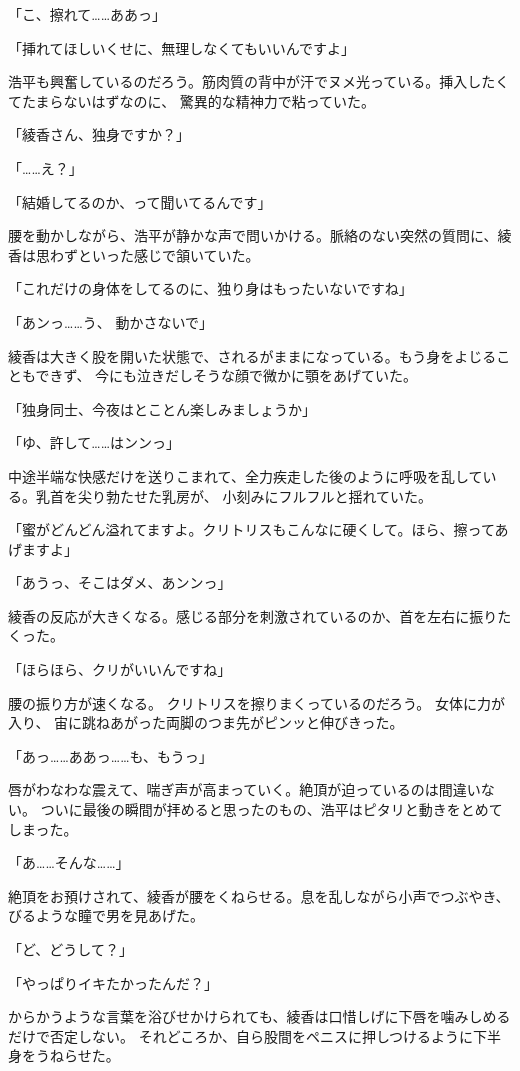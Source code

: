 ﻿\documentclass[
    book,tate,
    line_length=30zw,
    jafontsize=12pt,
    paper=b5j,
    landscape,
    ]{jlreq}
\begin{document}
「こ、擦れて……ああっ」

「挿れてほしいくせに、無理しなくてもいいんですよ」

浩平も興奮しているのだろう。筋肉質の背中が汗でヌメ光っている。挿入したくてたまらないはずなのに、
驚異的な精神力で粘っていた。

「綾香さん、独身ですか？」

「……え？」

「結婚してるのか、って聞いてるんです」

腰を動かしながら、浩平が静かな声で問いかける。脈絡のない突然の質問に、綾香は思わずといった感じで頷いていた。

「これだけの身体をしてるのに、独り身はもったいないですね」

「あンっ……う、 動かさないで」

綾香は大きく股を開いた状態で、されるがままになっている。もう身をよじることもできず、
今にも泣きだしそうな顔で微かに顎をあげていた。

「独身同士、今夜はとことん楽しみましょうか」

「ゆ、許して……はンンっ」

中途半端な快感だけを送りこまれて、全力疾走した後のように呼吸を乱している。乳首を尖り勃たせた乳房が、
小刻みにフルフルと揺れていた。

「蜜がどんどん溢れてますよ。クリトリスもこんなに硬くして。ほら、擦ってあげますよ」

「あうっ、そこはダメ、あンンっ」

綾香の反応が大きくなる。感じる部分を刺激されているのか、首を左右に振りたくった。

「ほらほら、クリがいいんですね」

腰の振り方が速くなる。 クリトリスを擦りまくっているのだろう。 女体に力が入り、
宙に跳ねあがった両脚のつま先がピンッと伸びきった。

「あっ……ああっ……も、もうっ」

唇がわなわな震えて、喘ぎ声が高まっていく。絶頂が迫っているのは間違いない。
ついに最後の瞬間が拝めると思ったのもの、浩平はピタリと動きをとめてしまった。

「あ……そんな……」

絶頂をお預けされて、綾香が腰をくねらせる。息を乱しながら小声でつぶやき、びるような瞳で男を見あげた。

「ど、どうして？」

「やっぱりイキたかったんだ？」

からかうような言葉を浴びせかけられても、綾香は口惜しげに下唇を噛みしめるだけで否定しない。
それどころか、自ら股間をペニスに押しつけるように下半身をうねらせた。
\end{document}
